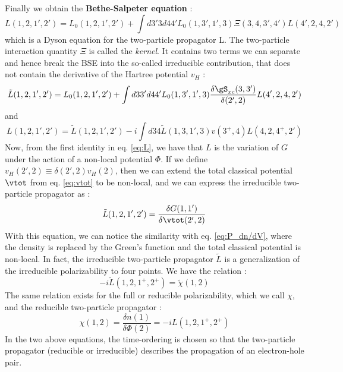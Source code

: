 Finally we obtain the \textbf{Bethe-Salpeter equation} :
\begin{equation}
	L(1,2,1',2') = L_0(1,2,1',2') + \int d3'3d44' L_0(1,3',1',3) \Xi(3,4,3',4') L(4',2,4,2')
\end{equation}
which is a Dyson equation for the two-particle propagator L. The two-particle interaction quantity $\Xi$ is called the \textit{kernel}. It contains two terms we can separate and hence break the \gls{BSE} into the so-called irreducible contribution, that does not contain the derivative of the Hartree potential $v_H$ :
\begin{equation}
	\tilde{L}(1,2,1',2') = L_0(1,2,1',2') + \int d33'd44' L_0(1,3',1',3) \frac{\delta \gS_{xc}(3,3')}{\delta(2',2)} L(4',2,4,2')
\end{equation} 
and 
\begin{equation}
	L(1,2,1',2') = \tilde{L}(1,2,1',2') -i \int d34 \tilde{L}(1,3,1',3) v(3^+,4) L(4,2,4^+,2')
\end{equation}
Now, from the first identity in eq. \eqref{eq:L}, we have that $L$ is the variation of $G$ under the action of a non-local potential $\Phi$. If we define $v_H(2',2) \equiv \delta(2',2)v_H(2)$, then we can extend the total classical potential $\vtot$ from eq. \eqref{eq:vtot} to be non-local, and we can express the irreducible two-particle propagator as :
\begin{equation}
	\tilde{L}(1,2,1',2') = \frac{\delta G(1,1')}{\delta \vtot(2',2)}
\end{equation}
With this equation, we can notice the similarity with eq. \eqref{eq:P_dn/dV}, where the density is replaced by the Green's function and the total classical potential is non-local. In fact, the irreducible two-particle propagator $\tilde{L}$ is a generalization of the irreducible polarizability to four points. We have the relation :
\begin{equation}
	-i \tilde{L}(1,2,1^+,2^+) = \tilde{\chi}(1,2) 
\end{equation}
The same relation exists for the full or reducible polarizability, which we call $\chi$, and the reducible two-particle propagator :
\begin{equation}
	\chi(1,2) = \frac{\delta n(1)}{\delta \Phi(2)} = -i L(1,2,1^+,2^+)
\end{equation}
In the two above equations, the time-ordering is chosen so that the two-particle propagator (reducible or irreducible) describes the propagation of an electron-hole pair.

